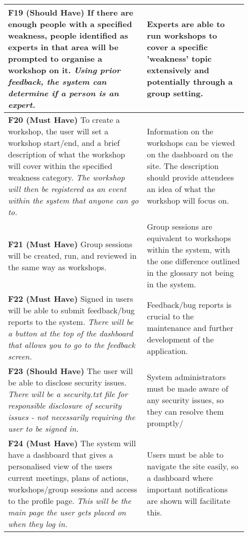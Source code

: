 \documentclass[10pt]{article}
\begin{document}
\begin{longtable}{|p{0.55\linewidth}|p{0.4\linewidth}|}
    \textbf{F19 (Should Have) }
    If there are enough people with a specified weakness, people identified as
    experts in that area will be prompted to organise a workshop on it.
    \textit{Using prior feedback, the system can determine if a person is an
    expert.}
        &
    Experts are able to run workshops to cover a specific 'weakness' topic
    extensively and potentially through a group setting.
    \\ \hline

    \textbf{F20 (Must Have) }
    To create a workshop, the user will set a workshop start/end, and a brief
    description of what the workshop will cover within the specified weakness
    category.
    \textit{The workshop will then be registered as an event within the system
    that anyone can go to.}
        &
    Information on the workshops can be viewed on the dashboard on the site. The
    description should provide attendees an idea of what the workshop will focus
    on.
    \\ \hline

    \textbf{F21 (Must Have) }
    Group sessions will be created, run, and reviewed in the same way as
    workshops.
        &
    Group sessions are equivalent to workshops within the system, with the one
    difference outlined in the glossary not being in the system.
    \\ \hline

    \textbf{F22 (Must Have) }
    Signed in users will be able to submit feedback/bug reports to the system.
    \textit{There will be a button at the top of the dashboard that allows you
    to go to the feedback screen.}
        &
    Feedback/bug reports is crucial to the maintenance and further development
    of the application.
    \\ \hline

    \textbf{F23 (Should Have) }
    The user will be able to disclose security issues.
    \textit{There will be a security.txt file for responsible disclosure of
    security issues - not necessarily requiring the user to be signed in.}
        &
    System administrators must be made aware of any security issues, so they can
    resolve them promptly/
    \\ \hline

    \textbf{F24 (Must Have) }
    The system will have a dashboard that gives a personalised view of the users
    current meetings, plans of actions, workshops/group sessions and access to
    the profile page.
    \textit{This will be the main page the user gets placed on when they log in.}
        &
    Users must be able to navigate the site easily, so a dashboard where
    important notifications are shown will facilitate this.
    \\ \hline


\end{longtable}
\end{document}
